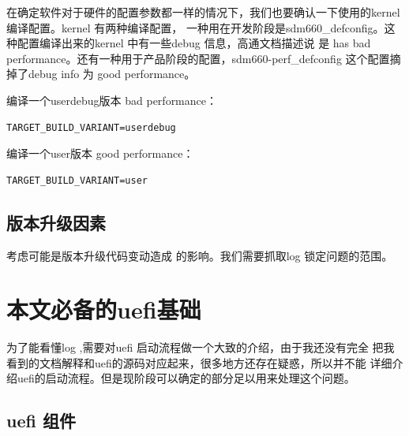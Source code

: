在确定软件对于硬件的配置参数都一样的情况下，我们也要确认一下使用的kernel 编译配置。kernel 有两种编译配置，
一种用在开发阶段是sdm660\_defconfig。这种配置编译出来的kernel 中有一些debug 信息，高通文档描述说 是 
has bad performance。还有一种用于产品阶段的配置，sdm660-perf\_defconfig  这个配置摘掉了debug info
为  good performance。

编译一个userdebug版本 bad performance：
\begin{lstlisting}
TARGET_BUILD_VARIANT=userdebug
\end{lstlisting}

编译一个user版本 good performance：
\begin{lstlisting}
TARGET_BUILD_VARIANT=user
\end{lstlisting}

\subsection{版本升级因素}
考虑可能是版本升级代码变动造成
的影响。我们需要抓取log 锁定问题的范围。




 

\section{本文必备的uefi基础}

为了能看懂log ,需要对uefi 启动流程做一个大致的介绍，由于我还没有完全
把我看到的文档解释和uefi的源码对应起来，很多地方还存在疑惑，所以并不能
详细介绍uefi的启动流程。但是现阶段可以确定的部分足以用来处理这个问题。


\subsection{uefi 组件}


